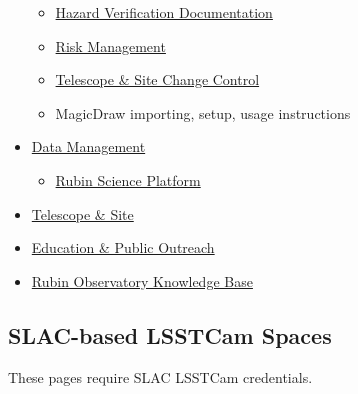 \begin{small}
\begin{itemize}
\begin{itemize}
		\item \href{https://confluence.lsstcorp.org/display/SYSENG/Hazard+Mitigation+Verification+Documentation}{Hazard Verification Documentation}
		\item \href{https://confluence.lsstcorp.org/display/RM/Risk+Management+on+JIRA}{Risk Management}
		\item \href{https://confluence.lsstcorp.org/pages/viewpage.action?pageId=3113550}{Telescope \& Site Change Control}
		\item MagicDraw importing, setup, usage instructions
	\end{itemize}
	\item \href{https://confluence.lsstcorp.org/display/DM/Data+Management+Home}{Data Management}
	\begin{itemize}
		\item \href{https://confluence.lsstcorp.org/display/LSP/Science+Platform+Operations+Home}{Rubin Science Platform}
	\end{itemize}
	\item \href{https://https//confluence.lsstcorp.org/pages/viewpage.action?pageId=1507765}{Telescope \& Site}
	\item \href{https://confluence.lsstcorp.org/pages/viewpage.action?pageId=25690606}{Education \& Public Outreach}
	\item \href{https://confluence.lsstcorp.org/display/LKB/Rubin+Lessons+Learned}{Rubin Observatory Knowledge Base}
\end{itemize}

\subsection{SLAC-based LSSTCam Spaces}
These pages require SLAC LSSTCam credentials.


\end{small}
